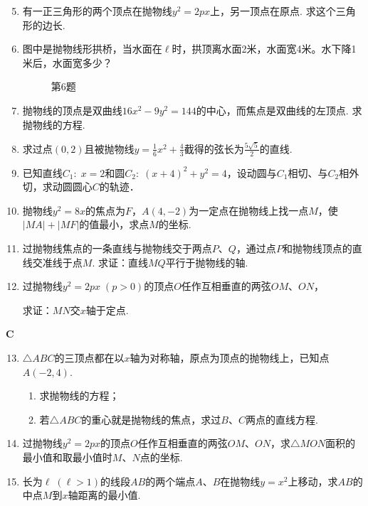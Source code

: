 \begin{enumerate}\setcounter{enumi}{4}
    \item 有一正三角形的两个顶点在抛物线$y^2=2px$上，另一顶点在原点. 求这个三角形的边长.
    \item 图中是抛物线形拱桥，当水面在$\ell$时，拱顶离水面2米，水面宽4米。水下降1米后，水面宽多少？
\begin{figure}[htp]
    \centering
{}
    \caption*{第6题}
\end{figure}
    \item 抛物线的顶点是双曲线$16x^2-9y^2=144$的中心，而焦点是双曲线的左顶点. 求抛物线的方程.
    \item 求过点$(0,2)$且被抛物线$y=\frac{1}{6}x^2+\frac{4}{3}$截得的弦长为$\frac{5\sqrt{5}}{2}$的直线.
    \item 已知直线$C_1:\; x=2$和圆$C_2:\; (x+4)^2+y^2=4$，设动圆与$C_1$相切、与$C_2$相外切，求动圆圆心$C$的轨迹．
    \item 抛物线$y^2=8x$的焦点为$F$，$A(4,-2)$为一定点在抛物线上找一点$M$，使$|MA|+|MF|$的值最小，求点$M$的坐标.
    \item 过抛物线焦点的一条直线与抛物线交于两点$P$、$Q$，通过点$P$和抛物线顶点的直线交准线于点$M$. 求证：直线$MQ$平行于抛物线的轴.
    \item 过抛物线$y^2=2px\; (p>0)$的顶点$O$任作互相垂直的两弦$OM$、$ON$，
    
    求证：$MN$交$x$轴于定点.
\end{enumerate}

\begin{center}
    \bfseries C
\end{center}
\begin{enumerate}\setcounter{enumi}{12}
\item $\triangle ABC$的三顶点都在以$x$轴为对称轴，原点为顶点的抛物线上，已知点$A(-2,4)$.
\begin{enumerate}[(1)]
\item 求抛物线的方程；
\item 若$\triangle ABC$的重心就是抛物线的焦点，求过$B$、$C$两点的直线方程.
\end{enumerate}

\item 过抛物线$y^2=2px$的顶点$O$任作互相垂直的两弦$OM$、$ON$，求$\triangle MON$面积的最小值和取最小值时$M$、$N$点的坐标.
\item 长为$\ell\; (\ell>1)$的线段$AB$的两个端点$A$、$B$在抛物线$y=x^2$上移动，求$AB$的中点$M$到$x$轴距离的最小值.
\end{enumerate}

